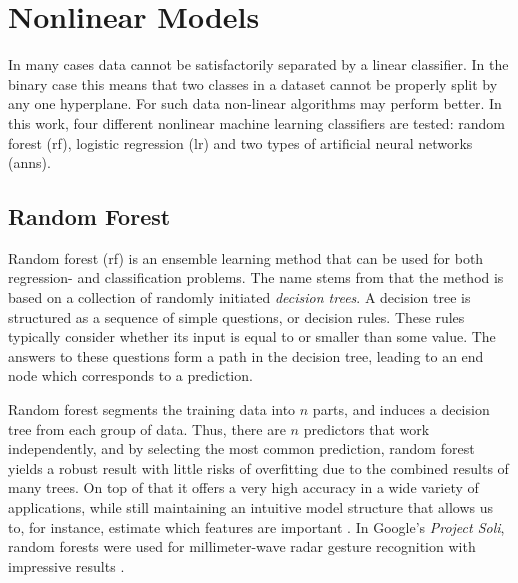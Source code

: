 \section{Nonlinear Models}

In many cases data cannot be satisfactorily separated by a linear classifier. In the binary case this means that two classes in a dataset cannot be properly split by any one hyperplane. For such data non-linear algorithms may perform better. In this work, four different nonlinear machine learning classifiers are tested: random forest (\gls{rf}), logistic regression (\gls{lr}) and two types of artificial neural networks (\gls{ann}s). 



\subsection{Random Forest}
Random forest (\gls{rf}) is an ensemble learning method that can be used for both regression- and classification problems. The name stems from that the method is based on a collection of randomly initiated \textit{decision trees}. A decision tree is structured as a sequence of simple questions, or decision rules. These rules typically consider whether its input is equal to or smaller than some value. The answers to these questions form a path in the decision tree, leading to an end node which corresponds to a prediction.

Random forest segments the training data into $n$ parts, and induces a decision tree from each group of data. Thus, there are $n$ predictors that work independently, and by selecting the most common prediction, random forest yields a robust result with little risks of overfitting due to the combined results of many trees. On top of that it offers a very high accuracy in a wide variety of applications, while still maintaining an intuitive model structure that allows us to, for instance, estimate which features are important \citep{breiman_2002}. In Google's \emph{Project Soli}, random forests were used for millimeter-wave radar gesture recognition with impressive results \citep{lien_gillian_karagozler_amihood_schwesig_olson_raja_poupyrev_2016}. 

